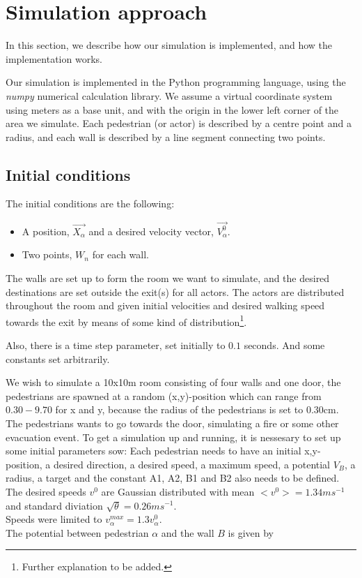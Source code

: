 \section{Simulation approach}
In this section, we describe how our simulation is implemented, and how the 
implementation works.

Our simulation is implemented in the Python programming language, using the 
\emph{numpy} numerical calculation library. We assume a virtual coordinate 
system using meters as a base unit, and with the origin in the lower left 
corner of the area we simulate. Each pedestrian (or actor) is described by a 
centre point and a radius, and each wall is described by a line segment 
connecting two points.

\subsection{Initial conditions}
The initial conditions are the following:

\begin{itemize}
    \item A position, $\vec{X_{\alpha}}$ and a desired velocity vector, $\vec{V^{0}_{\alpha}}$.
    \item Two points, $W_n$ for each wall.
\end{itemize}

The walls are set up to form the room we want to simulate, and the desired 
destinations are set outside the exit(s) for all actors. The actors are 
distributed throughout the room and given initial velocities and desired 
walking speed towards the exit by means of some kind of 
distribution\footnote{Further explanation to be added.}.

Also, there is a time step parameter, set initially to $0.1$ seconds. And some 
constants set arbitrarily.

We wish to simulate a 10x10m room consisting of four walls and one door, the pedestrians 
are spawned at a random (x,y)-position which can range from $0.30 - 9.70$ for x and y, 
because the radius of the pedestrians is set to $0.30$cm. The pedestrians wants to go 
towards the door, simulating a fire or some other evacuation event. To get a simulation 
up and running, it is nessesary to set up some initial parameters sow: Each pedestrian 
needs to have an initial x,y-position, a desired direction, a desired speed, a maximum 
speed, a potential $V_B$, a radius, a target and the constant A1, A2, B1 and B2 also needs 
to be defined.\\
The desired speeds $v^0$ are Gaussian distributed with mean $<v^0> = 1.34ms^{-1}$ and standard 
diviation $\sqrt{\theta} = 0.26ms^{-1}$.\\
Speeds were limited to $v_\alpha^{max}=1.3 v_\alpha^0$.\\
The potential between pedestrian $\alpha$ and the wall $B$ is given by 

